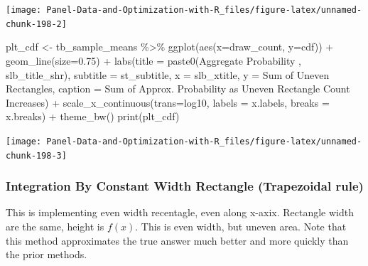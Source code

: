 \documentclass[
]{book}
\newenvironment{Shaded}{\begin{snugshade}}{\end{snugshade}}
\newcommand{\AttributeTok}[1]{\textcolor[rgb]{0.77,0.63,0.00}{#1}}
\newcommand{\FloatTok}[1]{\textcolor[rgb]{0.00,0.00,0.81}{#1}}
\newcommand{\FunctionTok}[1]{\textcolor[rgb]{0.00,0.00,0.00}{#1}}
\newcommand{\NormalTok}[1]{#1}
\newcommand{\OtherTok}[1]{\textcolor[rgb]{0.56,0.35,0.01}{#1}}
\newcommand{\SpecialCharTok}[1]{\textcolor[rgb]{0.00,0.00,0.00}{#1}}
\newcommand{\StringTok}[1]{\textcolor[rgb]{0.31,0.60,0.02}{#1}}
\begin{document}
\begin{center}\texttt{[image: Panel-Data-and-Optimization-with-R\_files/figure-latex/unnamed-chunk-198-2]} \end{center}

\begin{Shaded}
\begin{Highlighting}[]
\NormalTok{plt\_cdf }\OtherTok{\textless{}{-}}\NormalTok{ tb\_sample\_means }\SpecialCharTok{\%\textgreater{}\%}
  \FunctionTok{ggplot}\NormalTok{(}\FunctionTok{aes}\NormalTok{(}\AttributeTok{x=}\NormalTok{draw\_count, }\AttributeTok{y=}\NormalTok{cdf)) }\SpecialCharTok{+}
  \FunctionTok{geom\_line}\NormalTok{(}\AttributeTok{size=}\FloatTok{0.75}\NormalTok{) }\SpecialCharTok{+}
  \FunctionTok{labs}\NormalTok{(}\AttributeTok{title =} \FunctionTok{paste0}\NormalTok{(}\StringTok{\textquotesingle{}Aggregate Probability \textquotesingle{}}\NormalTok{, slb\_title\_shr),}
       \AttributeTok{subtitle =}\NormalTok{ st\_subtitle,}
       \AttributeTok{x =}\NormalTok{ slb\_xtitle,}
       \AttributeTok{y =} \StringTok{\textquotesingle{}Sum of Uneven Rectangles\textquotesingle{}}\NormalTok{,}
       \AttributeTok{caption =} \StringTok{\textquotesingle{}Sum of Approx. Probability as Uneven Rectangle Count Increases\textquotesingle{}}\NormalTok{) }\SpecialCharTok{+}
  \FunctionTok{scale\_x\_continuous}\NormalTok{(}\AttributeTok{trans=}\StringTok{\textquotesingle{}log10\textquotesingle{}}\NormalTok{, }\AttributeTok{labels =}\NormalTok{ x.labels, }\AttributeTok{breaks =}\NormalTok{ x.breaks) }\SpecialCharTok{+}
  \FunctionTok{theme\_bw}\NormalTok{()}
\FunctionTok{print}\NormalTok{(plt\_cdf)}
\end{Highlighting}
\end{Shaded}

\begin{center}\texttt{[image: Panel-Data-and-Optimization-with-R\_files/figure-latex/unnamed-chunk-198-3]} \end{center}

\hypertarget{integration-by-constant-width-rectangle-trapezoidal-rule}{%
\subsubsection{Integration By Constant Width Rectangle (Trapezoidal rule)}\label{integration-by-constant-width-rectangle-trapezoidal-rule}}

This is implementing even width recentagle, even along x-axix. Rectangle width are the same, height is \(f(x)\). This is even width, but uneven area. Note that this method approximates the true answer much better and more quickly than the prior methods.
\end{document}
